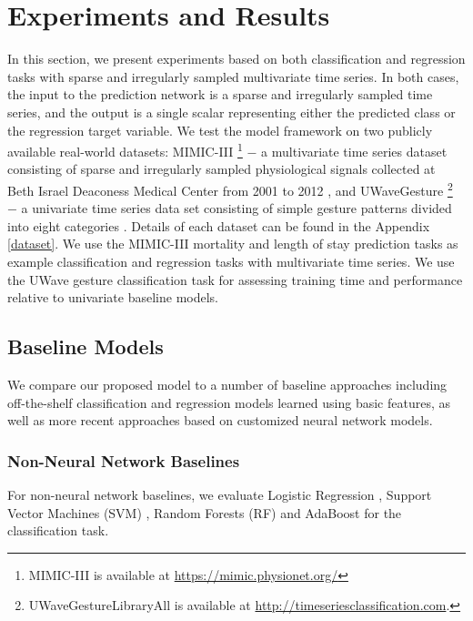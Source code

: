 \documentclass{article} \usepackage{iclr2019_conference,times}
\begin{document}
 

\section{Experiments and Results}

In  this section, we present experiments based on  both classification and regression tasks with sparse and irregularly sampled multivariate time series.
In both cases, the input to the prediction network is a sparse and irregularly sampled time series,
and the output is a single scalar representing either the predicted class or the regression target variable.
We test the model framework on two publicly available real-world datasets: MIMIC-III \footnote{MIMIC-III  is  available at \url{https://mimic.physionet.org/}} $-$ a multivariate time series dataset consisting of sparse and irregularly sampled physiological signals collected at Beth Israel Deaconess Medical Center
from 2001 to 2012 \citep{johnson2016mimic}, and UWaveGesture \footnote{UWaveGestureLibraryAll is available at \url{http://timeseriesclassification.com}.} $-$ a univariate time series data set consisting of simple gesture patterns divided into eight categories \citep{uwave}. Details of each dataset can be found in the Appendix \ref{dataset}.  We use the MIMIC-III mortality and length of stay prediction tasks as example classification and regression tasks with multivariate time series. We use the UWave gesture  classification task for assessing training time and performance relative to univariate baseline models.








\subsection{Baseline Models}
We compare our proposed model to a number of baseline approaches including off-the-shelf classification
and regression models learned using basic features, as well as more recent approaches
based on customized neural network models. 


\subsubsection{Non-Neural Network Baselines}
For non-neural network baselines, we evaluate Logistic Regression \citep{hosmer2013applied}, Support Vector Machines (SVM) \citep{cortes1995}, Random Forests (RF) \citep{breiman_rf} and AdaBoost \citep{adaboost} for the classification task.
\end{document}
